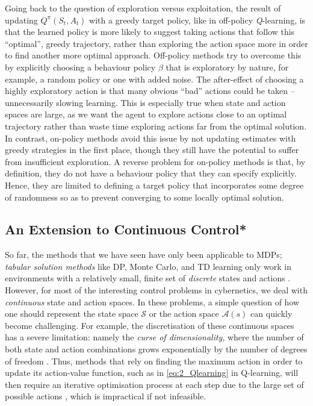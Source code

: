 Going back to the question of exploration versus exploitation, the result of updating $Q^\pi(S_t, A_t)$ with a greedy target policy, like in off-policy \textit{Q}-learning, is that the learned policy is more likely to suggest taking actions that follow this ``optimal'', greedy trajectory, rather than exploring the action space more in order to find another more optimal approach. 
Off-policy methods try to overcome this by explicitly choosing a behaviour policy $\beta$ that is exploratory by nature, for example, a random policy or one with added noise. The after-effect of choosing a highly exploratory action is that many obvious ``bad'' actions could be taken -- unnecessarily slowing learning. This is especially true when state and action spaces are large, as we want the agent to explore actions close to an optimal trajectory rather than waste time exploring actions far from the optimal solution. 
In contrast, on-policy methods avoid this issue by not updating estimates with greedy strategies in the first place, though they still have the potential to suffer from insufficient exploration. A reverse problem for on-policy methods is that, by definition, they do not have a behaviour policy that they can specify explicitly. Hence, they are limited to defining a target policy that incorporates some degree of randomness so as to prevent converging to some locally optimal solution.

\subsection{An Extension to Continuous Control*}
\label{subsec:2_an_extension_to_continuous_control}

So far, the methods that we have seen have only been applicable to MDPs; \textit{tabular solution methods} like DP, Monte Carlo, and TD learning only work in environments with a relatively small, finite set of \textit{discrete} states and actions \cite{suttonAndBartoBook}. However, for most of the interesting control problems in cybernetics, we deal with \textit{continuous} state and action spaces. In these problems, a simple question of how one should represent the state space $\mathcal{S}$ or the action space $\mathcal{A}(s)$ can quickly become challenging. 
For example, the discretisation of these continuous spaces has a severe limitation: namely the \textit{curse of dimensionality}, where the number of both state and action combinations grows exponentially by the number of degrees of freedom \cite{BellmanDreyfus1962Book}. Thus, methods that rely on finding the maximum action in order to update its action-value function, such as in \eqref{eq:2_Qlearning} in Q-learning, will then require an iterative optimisation process at each step due to the large set of possible actions \cite{DDPG}, which is impractical if not infeasible. 

